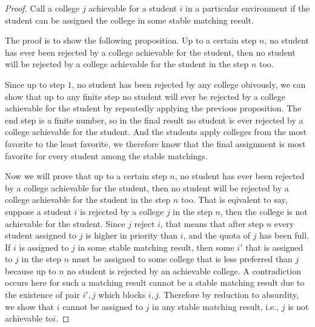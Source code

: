 \begin{proof}
Call a college $j$ achievable for a student $i$ in a particular
environment if the student can be assigned the college in some stable
matching result. 

The proof is to show the following proposition. Up to a certain step $ n $, no student has ever
been rejected by a college achievable for the student, then no student
will be rejected by a college achievable for the student in the step
$n$ too. 

Since up to step $1$, no student has been rejected by any
college obivously, we can show that up to  any finite step no student
will ever be rejected by  a college achievable for the student by
repeatedly applying the previous proposition.  The
end step is a finite number, so in the final result no student is ever
rejected by a college achievable for the student. And the students apply colleges from the most favorite to the least favorite, we therefore know that the final assignment is most favorite for every
student among the stable matchings.

Now we will prove that up to a certain step $ n $, no student has ever
been rejected by a college achievable for the student, then no student
will be rejected by a college achievable for the student in the step
$n$ too.  
That is
eqivalent to
say, suppose a
student $i$ is rejected by a college  $j$ in the
step $n$, then the college is not achievable for the student. Since
$j$ reject $i$, that means that  after
step $n$ every student assigned to $j$ is higher in priority than $i$,
and the quota of $j$ has been full. If $i$ is assigned to $j$ in some
stable 
matching result, then some $i'$ that is assigned to $j$ in the step
$n$ must be assigned to some college that is less preferred than $j$
because up to $n$ no student is rejected by an achievable college. A
contradiction occurs here for such a matching result cannot be
a stable matching result due to the existence of pair $i', j $ which
blocks $i, j$. Therefore by reduction to absurdity,  we show that $i$
cannot be assigned to $j$  in any stable matching result, i.e., $j$ is
not achievable to$i$.
\end{proof}



